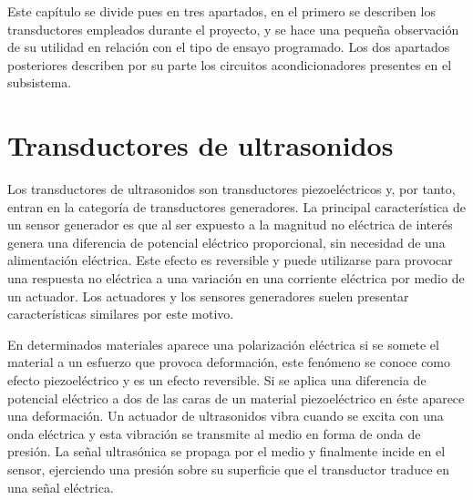 Este capítulo se divide pues en tres apartados, en el primero se describen
los transductores empleados durante el proyecto, y se hace una pequeña
observación de su utilidad en relación con el tipo de ensayo
programado. Los dos apartados posteriores describen por su parte los
circuitos acondicionadores presentes en el subsistema.

\section{Transductores de ultrasonidos}\label{sec:transducers}

Los transductores de ultrasonidos son transductores piezoeléctricos y, por
tanto, entran en la categoría de transductores generadores. La principal
característica de un sensor generador es que al ser expuesto a la magnitud
no eléctrica de interés genera una diferencia de potencial eléctrico
proporcional, sin necesidad de una alimentación eléctrica. Este efecto es
reversible y puede utilizarse para provocar una respuesta no eléctrica a
una variación en una corriente eléctrica por medio de un actuador. Los
actuadores y los sensores generadores suelen presentar características
similares por este motivo.

En determinados materiales aparece una polarización eléctrica si se somete
el material a un esfuerzo que provoca deformación, este fenómeno se conoce
como efecto piezoeléctrico y es un efecto reversible. Si se aplica una
diferencia de potencial eléctrico a dos de las caras de un material
piezoeléctrico en éste aparece una deformación. Un actuador de ultrasonidos
vibra cuando se excita con una onda eléctrica y esta vibración se transmite
al medio en forma de onda de presión. La señal ultrasónica se propaga por
el medio y finalmente incide en el sensor, ejerciendo una presión sobre su
superficie que el transductor traduce en una señal eléctrica.


